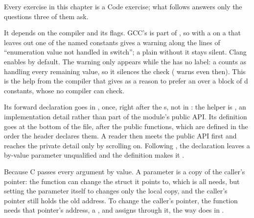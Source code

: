Every exercise in this chapter is a Code exercise; what follows answers only the questions three of
them ask.

It depends on the compiler and its flags. GCC's  is part of , so with
 a  on a  that leaves out one of the named constants gives a
warning along the lines of ``enumeration value  not handled in switch''; a plain
 without it stays silent. Clang enables  by default. The warning
only appears while the  has no  label: a  counts as
handling every remaining value, so it silences the check ( warns even then).
This is the help from the compiler that  gives as a reason to prefer an 
over a block of d constants, whose  no compiler can check.

Its forward declaration goes in , once, right after the s, not
in : the helper is , an implementation detail rather than part of
the module's public API. Its definition goes at the bottom of the file, after the public functions,
which are defined in the order the header declares them. A reader then meets the public API first
and reaches the private detail only by scrolling on. Following , the declaration
leaves a by-value parameter unqualified and the definition makes it .

Because C passes every argument by value. A  parameter is a copy of the
caller's pointer: the function can change the struct it points to, which is all
 needs, but setting the parameter itself to  changes only the
local copy, and the caller's pointer still holds the old address. To change the caller's pointer,
the function needs that pointer's address, a , and assigns 
through it, the way  does in .

